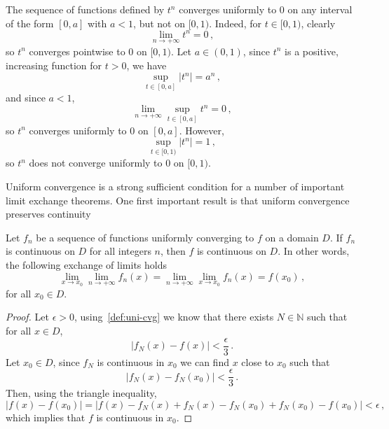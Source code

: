 \begin{example}
  The sequence of functions defined by $t^n$ converges uniformly to $0$ on any interval of
  the form $[0,a]$ with $a<1$, but not on $[0,1)$. Indeed, for $t\in [0,1)$, clearly
  \begin{equation}
    \lim_{n\to+\infty}t^n=0\,,
  \end{equation}
  so $t^n$ converges pointwise to $0$ on $[0,1)$. Let $a\in(0,1)$, since $t^n$ is a
  positive, increasing function for $t>0$, we have
  \begin{equation}
    \sup_{t\in[0,a]}|t^n|=a^n\,,
  \end{equation}
  and since $a<1$,
  \begin{equation}
    \lim_{n\to+\infty}\sup_{t\in[0,a]}t^n=0\,,
  \end{equation}
  so $t^n$ converges uniformly to $0$ on $[0,a]$. However,
  \begin{equation}
    \sup_{t\in[0,1)}|t^n|=1\,,
  \end{equation}
  so $t^n$ does not converge uniformly to $0$ on $[0,1)$.
\end{example}
Uniform convergence is a strong sufficient condition for a number of important limit
exchange theorems. One first important result is that uniform convergence preserves
continuity
\begin{theorem}
  \label{thm:uniconv-continuous}
  Let $f_n$ be a sequence of functions uniformly converging to $f$ on a domain $D$. If
  $f_n$ is continuous on $D$ for all integers $n$, then $f$ is continuous on $D$. In other
  words, the following exchange of limits holds
  \begin{equation}
    \lim_{x\to x_0}\lim_{n\to+\infty}f_n(x)=\lim_{n\to+\infty}\lim_{x\to x_0}f_n(x)=f(x_0)\,,
  \end{equation}
  for all $x_0\in D$.
\end{theorem}
\begin{proof}
  Let $\epsilon>0$, using~\cref{def:uni-cvg} we know that there exists $N\in\mathbb{N}$
  such that for all $x\in D$,
  \begin{equation}
    |f_N(x)-f(x)|<\frac{\epsilon}{3}\,.
  \end{equation}
  Let $x_0\in D$, since $f_N$ is continuous in $x_0$ we can find $x$ close to $x_0$ such
  that
  \begin{equation}
    |f_N(x)-f_N(x_0)|<\frac{\epsilon}{3}\,.
  \end{equation}
  Then, using the triangle inequality,
  \begin{equation}
    |f(x)-f(x_0)|=|f(x)-f_N(x)+f_N(x)-f_N(x_0)+f_N(x_0)-f(x_0)|<\epsilon\,,
  \end{equation}
  which implies that $f$ is continuous in $x_0$.
\end{proof}
